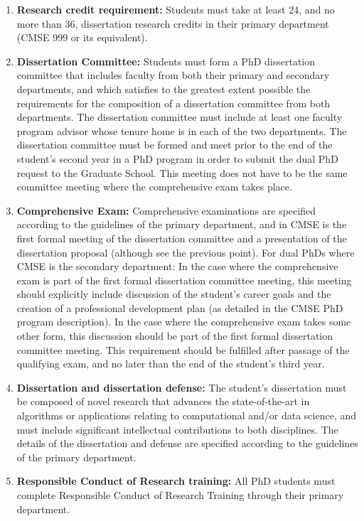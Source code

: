 \begin{enumerate}
\item \textbf{Research credit requirement:}  Students must take at
  least 24, and no more than 36, dissertation research credits in
  their primary department (CMSE 999 or its equivalent).

\item \textbf{Dissertation Committee:} Students must form a PhD dissertation
  committee that includes faculty from both their primary and
  secondary departments, and which satisfies to the greatest extent
  possible the requirements for the composition of a dissertation committee
  from both departments.  The dissertation committee must include at least
  one faculty program advisor whose tenure home is in each of the two
  departments.  The dissertation committee must be formed and meet prior to
  the end of the student's second year in a PhD program in order to
  submit the dual PhD request to the Graduate School.  This meeting
  does not have to be the same committee meeting where the
  comprehensive exam takes place.

\item \textbf{Comprehensive Exam:}  Comprehensive examinations are
  specified according to the guidelines of the primary department, and
  in CMSE is the first formal meeting of the dissertation committee and a
  presentation of the dissertation proposal (although see the previous
  point).  For dual PhDs where CMSE is the secondary department: In
  the case where the comprehensive exam is part of the first formal
  dissertation committee meeting, this meeting should explicitly include
  discussion of the student's career goals and the creation of a
  professional development plan (as detailed in the CMSE PhD program
  description).  In the case where the comprehensive exam takes some
  other form, this discussion should be part of the first formal
  dissertation committee meeting.  This requirement should be fulfilled
  after passage of the qualifying exam, and no later than the end of
 the student's third year.

\item \textbf{Dissertation and dissertation defense:} The student's
  dissertation must be composed of novel research that advances the
  state-of-the-art in algorithms or applications relating to
  computational and/or data science, and must include significant
  intellectual contributions to both disciplines.  The details of the
  dissertation and defense are specified according to the guidelines
  of the primary department.

\item \textbf{Responsible Conduct of Research training:} All PhD
  students must complete Responsible Conduct of Research Training
  through their primary department.

\end{enumerate}

